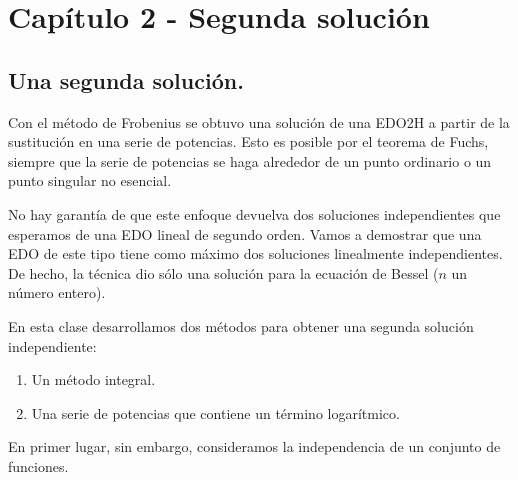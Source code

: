 \chapter{Capítulo 2 - Segunda solución}
\section{Una segunda solución.}
Con el método de Frobenius se obtuvo una solución de una EDO2H a partir de la sustitución en una serie de potencias. Esto es posible por el teorema de Fuchs, siempre que la serie de potencias se haga alrededor de un punto ordinario o un punto singular no esencial.
\par
No hay garantía de que este enfoque devuelva dos soluciones independientes que esperamos de una EDO lineal de segundo orden. Vamos a demostrar que una EDO de este tipo tiene como máximo dos soluciones linealmente independientes. De hecho, la técnica dio sólo una solución para la ecuación de Bessel ($n$ un número entero).
\par
En esta clase desarrollamos dos métodos para obtener una segunda solución independiente:
\begin{enumerate}
\item Un método integral.
\item Una serie de potencias que contiene un término logarítmico.
\end{enumerate}
En primer lugar, sin embargo, consideramos la independencia de un conjunto de funciones.
